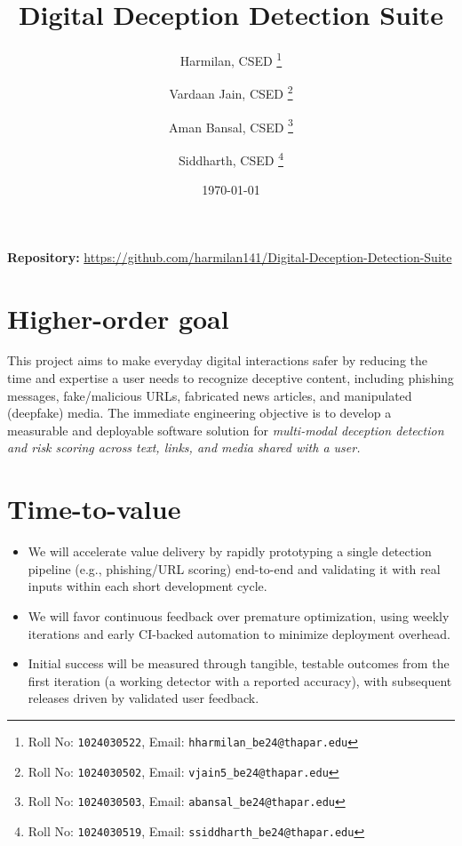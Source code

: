 \documentclass[11pt,a4paper]{article}
\title{Digital Deception Detection Suite}
\author{
  Harmilan, CSED%
  \thanks{Roll No: \texttt{1024030522}, Email: \texttt{hharmilan\_be24@thapar.edu}}
  \and
  Vardaan Jain, CSED%
  \thanks{Roll No: \texttt{1024030502}, Email: \texttt{vjain5\_be24@thapar.edu}}
  \and
  Aman Bansal, CSED%
  \thanks{Roll No: \texttt{1024030503}, Email: \texttt{abansal\_be24@thapar.edu}}
  \and
  Siddharth, CSED%
  \thanks{Roll No: \texttt{1024030519}, Email: \texttt{ssiddharth\_be24@thapar.edu}}
}
\date{\today}
\newcommand{\BvrHint}[1]{%
  {\normalfont\normalsize\itshape\hfill #1}}
\begin{document}
\maketitle

\begin{center}
  \textbf{Repository:} \url{https://github.com/harmilan141/Digital-Deception-Detection-Suite}
\end{center}

\section{Higher-order goal%
  \BvrHint{}}
This project aims to make everyday digital interactions safer by reducing the time and expertise a user needs to recognize deceptive content, including phishing messages, fake/malicious URLs, fabricated news articles, and manipulated (deepfake) media. The immediate engineering objective is to develop a measurable and deployable software solution for \emph{multi-modal deception detection and risk scoring across text, links, and media shared with a user.}

\section{Time-to-value %
\BvrHint{}}
\begin{itemize}[leftmargin=0.7cm]
    \item We will accelerate value delivery by rapidly prototyping a single detection pipeline (e.g., phishing/URL scoring) end-to-end and validating it with real inputs within each short development cycle.
    \item We will favor continuous feedback over premature optimization, using weekly iterations and early CI-backed automation to minimize deployment overhead.
    \item Initial success will be measured through tangible, testable outcomes from the first iteration (a working detector with a reported accuracy), with subsequent releases driven by validated user feedback.
\end{itemize}
\end{document}
